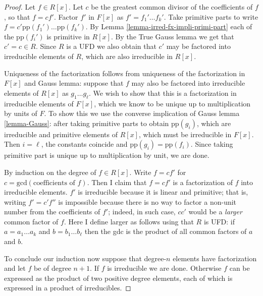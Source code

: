 \begin{proof}
Let $f\in R[x]$. Let $c$ be the greatest
common divisor of the coefficients of
$f$, so that $f=cf'$. Factor $f'$ in $F[x]$
as $f'=f_1'\ldots f_k'$. Take
primitive parts to write
$f=c'\text{pp}(f_1')\ldots \text{pp}(f_k')$.
By Lemma
\ref{lemma-irred-fx-impli-primi-part} each of
the
$\text{pp}(f_i')$ is primitive in $R[x]$. By
the True Gauss lemma we get that
$c'=c\in R$. Since $R$ is a UFD we also
obtain that
$c'$ may be factored into irreducible
elements of $R$, which are also
irreducible in $R[x]$.

Uniqueness of the factorization follows from
uniqueness of the factorization in
$F[x]$ and Gauss lemma: suppose that $f$ may
also be factored into irreducible
elements of $R[x]$ as $g_1\ldots g_\ell$. We
wish to show that this is a
factorization in irreducible elements of
$F[x]$, which we know to be unique up
to multiplication by units of $F$. To show
this we use the converse implication
of Gauss lemma \ref{lemma-Gauss}: after
taking primitive parts to obtain
$\text{pp}(g_i)$, which are irreducible and
primitive elements of $R[x]$, which
must be irreducible in $F[x]$. Then $i=\ell$,
the constants coincide and
$\text{pp}(g_i)=\text{pp}(f_i)$. Since taking
primitive part is unique up to
multiplication by unit, we are done.

By induction on the degree of $f \in R[x]$.
Write $f=cf'$ for
$c=\text{gcd}(\text{coefficients of $f$})$.
Then I claim that $f=cf'$ is a
factorization of $f$ into irreducible
elements. $f'$ is irreducible because it
is linear and primitive; that is, writing
$f'=c'f''$ is impossible because
there is no way to factor a non-unit number
from the coefficients of $f'$;
indeed, in such case, $cc'$ would be a {\it
larger} common factor of $f$. Here I
define larger as follows using that $R$ is
UFD: if $a=a_1\ldots a_k$ and
$b=b_1\ldots b_\ell$ then the gdc is the
product of all common factors of $a$
and $b$.

To conclude our induction now suppose that
degree-$n$ elements have
factorization and let $f$ be of degree $n+1$.
If $f$ is irreducible we are done.
Otherwise $f$ can be expressed as the product
of two positive degree elements,
each of which is expressed in a product of
irreducibles.
\end{proof}







